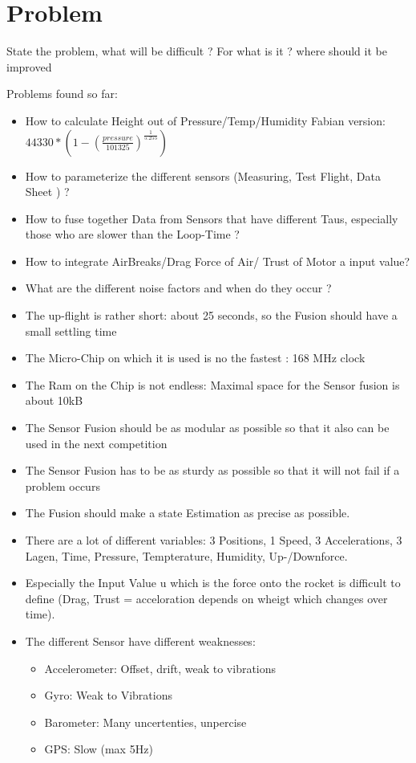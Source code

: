  
 \section{Problem}
 State the problem, what will be difficult ? For what is it ? where should it be improved
 
 Problems found so far:
 \begin{itemize}
  \item How to calculate Height out of Pressure/Temp/Humidity Fabian version: $44330 * (1 - (\frac{pressure}{101325})^{ \frac{1}{5.255}})$
  \item How to parameterize the different sensors (Measuring, Test Flight, Data Sheet ) ? 
  \item How to fuse together Data from Sensors that have different Taus, especially those who are slower than the Loop-Time ?
  \item How to integrate AirBreaks/Drag Force of Air/ Trust of Motor a input value?
  \item What are the different noise factors and when do they occur ?
  \item The up-flight is rather short: about 25 seconds, so the Fusion should have a small settling time
  \item The Micro-Chip on which it is used is no the fastest : 168 MHz clock
  \item The Ram on the Chip is not endless: Maximal space for the Sensor fusion is about 10kB
  \item The Sensor Fusion should be as modular as possible so that it also can be used in the next competition
  \item The Sensor Fusion has to be as sturdy as possible so that it will not fail if a problem occurs
  \item The Fusion should make a state Estimation as precise as possible.
  \item There are a lot of different variables: 3 Positions, 1 Speed, 3 Accelerations, 3 Lagen, Time, Pressure, Tempterature, Humidity, Up-/Downforce.
  \item Especially the Input Value u which is the force onto the rocket is difficult to define (Drag, Trust = acceloration depends on wheigt which changes over time).
  \item The different Sensor have different weaknesses: \begin{itemize}
							 \item Accelerometer: Offset, drift, weak to vibrations
                                                         \item Gyro: Weak to Vibrations
                                                         \item Barometer: Many uncertenties, unpercise
                                                         \item GPS: Slow (max 5Hz)
                                                        \end{itemize}
                                                        
								  
 \end{itemize}

